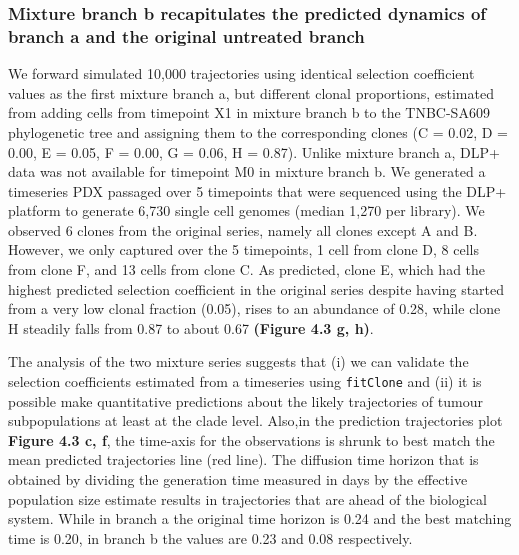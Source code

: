 \subsubsection{Mixture branch b recapitulates the predicted dynamics of branch a and the original untreated branch}
We forward simulated 10,000 trajectories using identical selection coefficient values as the first mixture branch a, but different clonal proportions, estimated from adding cells from timepoint X1 in mixture branch b to the TNBC-SA609 phylogenetic tree and assigning them to the corresponding clones (C = 0.02, D = 0.00, E = 0.05, F = 0.00, G = 0.06, H = 0.87). Unlike mixture branch a, DLP+ data was not available for timepoint M0 in mixture branch b. We generated a timeseries PDX passaged over 5 timepoints that were sequenced using the DLP+ platform to generate 6,730 single cell genomes (median 1,270 per library). We observed 6 clones from the original series, namely all clones except A and B. However, we only captured over the 5 timepoints, 1 cell from clone D, 8 cells from clone F, and 13 cells from clone C. As predicted, clone E, which had the highest predicted selection coefficient in the original series despite having started from a very low clonal fraction (0.05), rises to an abundance of 0.28, while clone H steadily falls from 0.87 to about 0.67 \textbf{(Figure 4.3 g, h)}.

The analysis of the two mixture series suggests that (i) we can validate the selection coefficients estimated from a timeseries using \texttt{fitClone} and (ii) it is possible make quantitative predictions about the likely trajectories of tumour subpopulations at least at the clade level. Also,in the prediction trajectories plot \textbf{Figure 4.3 c, f}, the time-axis for the observations is shrunk to best match the mean predicted trajectories line (red line). The diffusion time horizon that is obtained by dividing the generation time measured in days by the effective population size estimate results in trajectories that are ahead of the biological system. While in branch a the original time horizon is 0.24 and the best matching time is 0.20, in branch b the values are 0.23 and 0.08 respectively.





